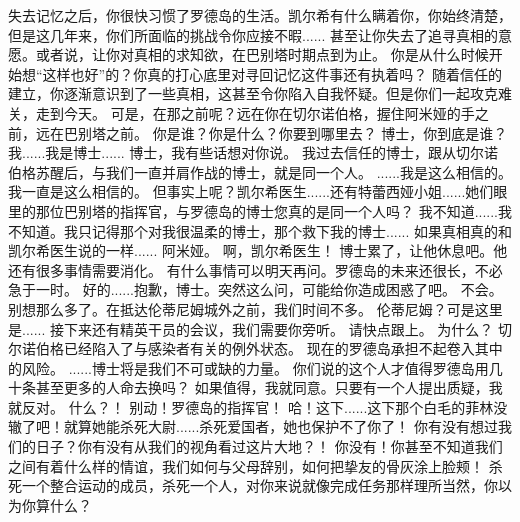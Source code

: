 \documentclass[openany]{book}
\begin{document}
\begin{dialogue}
     失去记忆之后，你很快习惯了罗德岛的生活。凯尔希有什么瞒着你，你始终清楚，但是这几年来，你们所面临的挑战令你应接不暇......
     甚至让你失去了追寻真相的意愿。或者说，让你对真相的求知欲，在巴别塔时期点到为止。
     你是从什么时候开始想“这样也好”的？你真的打心底里对寻回记忆这件事还有执着吗？
     随着信任的建立，你逐渐意识到了一些真相，这甚至令你陷入自我怀疑。但是你们一起攻克难关，走到今天。
     可是，在那之前呢？远在你在切尔诺伯格，握住阿米娅的手之前，远在巴别塔之前。
     你是谁？你是什么？你要到哪里去？
     博士，你到底是谁？
     我......我是博士......
     博士，我有些话想对你说。
     我过去信任的博士，跟从切尔诺伯格苏醒后，与我们一直并肩作战的博士，就是同一个人。
     ......我是这么相信的。我一直是这么相信的。
     但事实上呢？凯尔希医生......还有特蕾西娅小姐......她们眼里的那位巴别塔的指挥官，与罗德岛的博士您真的是同一个人吗？
     我不知道......我不知道。我只记得那个对我很温柔的博士，那个救下我的博士......
     如果真相真的和凯尔希医生说的一样......
     阿米娅。
     啊，凯尔希医生！
     博士累了，让他休息吧。他还有很多事情需要消化。
     有什么事情可以明天再问。罗德岛的未来还很长，不必急于一时。
     好的......抱歉，博士。突然这么问，可能给你造成困惑了吧。
     不会。
     别想那么多了。在抵达伦蒂尼姆城外之前，我们时间不多。
     伦蒂尼姆？可是这里是......
     接下来还有精英干员的会议，我们需要你旁听。
     请快点跟上。
     为什么？
     切尔诺伯格已经陷入了与感染者有关的例外状态。
     现在的罗德岛承担不起卷入其中的风险。
     ......博士将是我们不可或缺的力量。
     你们说的这个人才值得罗德岛用几十条甚至更多的人命去换吗？
     如果值得，我就同意。只要有一个人提出质疑，我就反对。
     什么？！
     别动！罗德岛的指挥官！
     哈！这下......这下那个白毛的菲林没辙了吧！就算她能杀死大尉......杀死爱国者，她也保护不了你了！
     你有没有想过我们的日子？你有没有从我们的视角看过这片大地？！
     你没有！你甚至不知道我们之间有着什么样的情谊，我们如何与父母辞别，如何把挚友的骨灰涂上脸颊！
     杀死一个整合运动的成员，杀死一个人，对你来说就像完成任务那样理所当然，你以为你算什么？

\end{dialogue}
\end{document}
